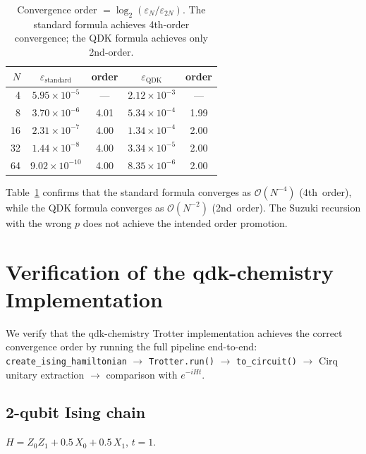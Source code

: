 \documentclass[11pt]{article}
\begin{document}
\begin{table}[h]
\centering
\begin{tabular}{rcccc}
\toprule
$N$ & $\varepsilon_{\text{standard}}$ & order & $\varepsilon_{\text{QDK}}$ & order \\
\midrule
 4  & $5.95 \times 10^{-5}$ & ---  & $2.12 \times 10^{-3}$ & ---  \\
 8  & $3.70 \times 10^{-6}$ & 4.01 & $5.34 \times 10^{-4}$ & 1.99 \\
16  & $2.31 \times 10^{-7}$ & 4.00 & $1.34 \times 10^{-4}$ & 2.00 \\
32  & $1.44 \times 10^{-8}$ & 4.00 & $3.34 \times 10^{-5}$ & 2.00 \\
64  & $9.02 \times 10^{-10}$& 4.00 & $8.35 \times 10^{-6}$ & 2.00 \\
\bottomrule
\end{tabular}
\caption{Convergence order $= \log_2(\varepsilon_N / \varepsilon_{2N})$.  The
standard formula achieves 4th-order convergence; the QDK formula achieves only
2nd-order.}
\label{tab:convergence}
\end{table}

\noindent
Table~\ref{tab:convergence} confirms that the standard formula converges as
$\mathcal{O}(N^{-4})$ (4th~order), while the QDK formula converges as
$\mathcal{O}(N^{-2})$ (2nd~order).  The Suzuki recursion with the wrong $p$
does not achieve the intended order promotion.

\section{Verification of the qdk-chemistry Implementation}

We verify that the qdk-chemistry Trotter implementation achieves the correct
convergence order by running the full pipeline end-to-end:
\texttt{create\_ising\_hamiltonian} $\to$ \texttt{Trotter.run()} $\to$
\texttt{to\_circuit()} $\to$ Cirq unitary extraction $\to$ comparison with
$e^{-iHt}$.

\subsection{2-qubit Ising chain}

$H = Z_0 Z_1 + 0.5\,X_0 + 0.5\,X_1$, $t = 1$.
\end{document}
